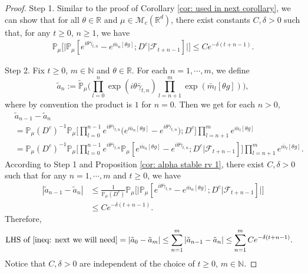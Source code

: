 \documentclass[12pt,a4paper]{amsart}
\theoremstyle{plain}
\theoremstyle{definition}
\numberwithin{equation}{section}
\begin{document}
\begin{proof}
    Step 1. Similar to the proof of Corollary \ref{cor: used in next corollary}, we can show that  for all $\theta\in \mathbb{R}$ and $\mu\in \mathcal{M}_c(\mathbb{R}^d)$, there exist constants $C,\delta>0$ such that, for any $t\geq 0$, $n\geq 1$, we have
\begin{align}
    \mathbb{P}_{\mu}\Big[\big|\mathbb{P}_{\mu}[e^{i\theta\bar{\gamma}_{t,n}}-e^{\bar{m}_n[\theta g]}; D^c | \mathscr F_{t+n-1}]\big|\Big]\leq Ce^{-\delta(t+n-1)}.
\end{align}
    
    Step 2.   
    Fix $t\geq 0$, $m\in \mathbb{N}$ and $\theta\in \mathbb{R}$.
    For each $n=1,\cdots,m$, we define
    \[\tilde{a}_n:=\mathbb{\tilde{P}}_{\mu}\Big(\prod_{l=0}^{n}\exp\left(i\theta\bar{\gamma}_{t,n}\right)\prod_{l=n+1}^{m}\exp(\bar{m}_l[\theta g])\Big),\] where by convention the product is $1$ for $n=0$. Then we get for each $n > 0$,
\begin{align*}
    &\tilde{a}_{n-1} - \tilde{a}_n
    \\&=\mathbb{P}_{\mu}(D^c)^{-1}\mathbb{P}_{\mu}\Big[\prod_{l=0}^{n-1}e^{i\theta\bar{\gamma}_{t,n}}\Big(e^{\bar{m}_n[\theta g]}-e^{i\theta \bar{\gamma}_{t,n}}\Big);D^c\Big]\prod_{l=n+1}^{m}e^{\bar{m}_l[\theta g]}
    \\&=\mathbb{P}_{\mu}(D^c)^{-1}\mathbb{P}_{\mu}\Big[\prod_{l=0}^{n-1}e^{i\theta\bar{\gamma}_{t,n}}\mathbb{P}_{\mu}[e^{\bar{m}_n[\theta g]}-e^{i\theta \bar{\gamma}_{t,n}};D^c|\mathscr{F}_{t+n-1}]\Big]\prod_{l=n+1}^{m}e^{\bar{m}_l[\theta g]}.
\end{align*}
    According to Step 1 and Proposition \ref{cor: alpha stable rv 1}, there exist $C,\delta>0$ such that for any $n=1,\cdots, m$ and $t\geq0$, we have
\begin{align*}
    |\tilde{a}_{n-1}- \tilde{a}_n|
    &\leq \frac{1}{\mathbb{P}_{\mu}(D^c)}\mathbb{P}_{\mu}\Big[\big|\mathbb P_\mu[e^{i\theta\bar{\gamma}_{t,n}}-e^{\bar{m}_n[\theta g]}; D^c\big|\mathscr{F}_{t+n-1}]\big|\Big]
    \\& \leq C e^{-\delta(t+n-1)}.
\end{align*}
    Therefore,
\begin{align}
    \text{LHS of \eqref{ineq: next we will need}}
    &= \left|\tilde{a}_{0}-\tilde{a}_m\right|
    \leq\sum_{n=1}^m\left|\tilde{a}_{n-1}-\tilde{a}_n\right|
    \leq \sum_{n=1}^m C e^{-\delta(t+n-1)}.
\end{align}
	Notice that $C, \delta>0$ are independent of the choice of $t\geq 0$, $m\in \mathbb{N}$.
\end{proof}
\end{document}
